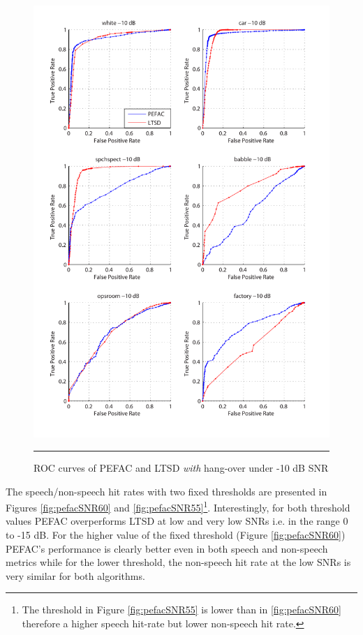 \begin{figure}[htbp]
	\centering
		\includegraphics[width=1.0\columnwidth]{Figures/Chapter5/pefacm10.pdf}
		\rule{37em}{0.5pt}
	\caption[ROC curves of PEFAC and LTSD \emph{with} hang-over under -10 dB SNR]{ROC curves of PEFAC and LTSD \emph{with} hang-over under -10 dB SNR}
	\label{fig:pefacm10}
\end{figure}

The speech/non-speech hit rates with two fixed thresholds are presented in Figures \ref{fig:pefacSNR60} and \ref{fig:pefacSNR55}\footnote{The threshold in Figure \ref{fig:pefacSNR55} is lower than in \ref{fig:pefacSNR60} therefore a higher speech hit-rate but lower non-speech hit rate.}. Interestingly, for both threshold values PEFAC overperforms LTSD at low and very low SNRs i.e. in the range 0 to -15 dB. For the higher value of the fixed threshold (Figure \ref{fig:pefacSNR60}) PEFAC's performance is clearly better even in both speech and non-speech metrics while for the lower threshold, the non-speech hit rate at the low SNRs is very similar for both algorithms.

